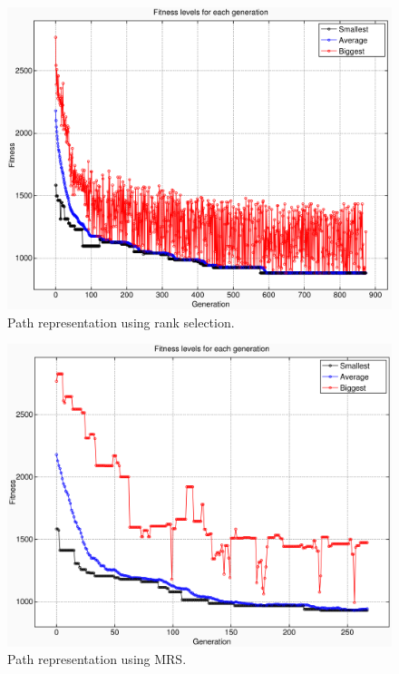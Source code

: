 \documentclass[10pt,a4paper,openbib]{article}
\begin{document}
\begin{multicols}{2}
\begin{figure}[H]
\begin{center}
\includegraphics[scale=0.4]{images/result4/GraphPathfalse3.png} 
\caption{Path representation using rank selection.}
\label{fig:cities20GraphPathfalse}
\end{center}
\end{figure}

\begin{figure}[H]
\begin{center}
\includegraphics[scale=0.4]{images/result4/GraphPathtrue9.png} 
\caption{Path representation using MRS.}
\label{fig:cities20GraphPathtrue}
\end{center}
\end{figure}


\end{multicols}
\end{document}

